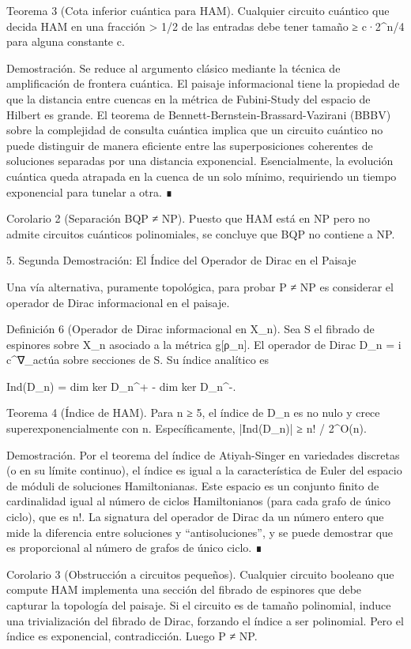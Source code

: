 \documentclass[12pt,a4paper]{book}
\begin{document}
Teorema 3 (Cota inferior cuántica para HAM). Cualquier circuito cuántico que decida HAM en una fracción > 1/2 de las entradas debe tener tamaño ≥ c·2^{n/4} para alguna constante c.

Demostración. Se reduce al argumento clásico mediante la técnica de amplificación de frontera cuántica. El paisaje informacional tiene la propiedad de que la distancia entre cuencas en la métrica de Fubini-Study del espacio de Hilbert es grande. El teorema de Bennett-Bernstein-Brassard-Vazirani (BBBV) sobre la complejidad de consulta cuántica implica que un circuito cuántico no puede distinguir de manera eficiente entre las superposiciones coherentes de soluciones separadas por una distancia exponencial. Esencialmente, la evolución cuántica queda atrapada en la cuenca de un solo mínimo, requiriendo un tiempo exponencial para tunelar a otra. ∎

Corolario 2 (Separación BQP ≠ NP). Puesto que HAM está en NP pero no admite circuitos cuánticos polinomiales, se concluye que BQP no contiene a NP.

5. Segunda Demostración: El Índice del Operador de Dirac en el Paisaje

Una vía alternativa, puramente topológica, para probar P ≠ NP es considerar el operador de Dirac informacional en el paisaje.

Definición 6 (Operador de Dirac informacional en X_n). Sea S el fibrado de espinores sobre X_n asociado a la métrica g[ρ_n]. El operador de Dirac D_n = i c^\mu ∇_\mu actúa sobre secciones de S. Su índice analítico es

Ind(D_n) = dim ker D_n^+ - dim ker D_n^-.

Teorema 4 (Índice de HAM). Para n ≥ 5, el índice de D_n es no nulo y crece superexponencialmente con n. Específicamente, |Ind(D_n)| ≥ n! / 2^{O(n)}.

Demostración. Por el teorema del índice de Atiyah-Singer en variedades discretas (o en su límite continuo), el índice es igual a la característica de Euler del espacio de móduli de soluciones Hamiltonianas. Este espacio es un conjunto finito de cardinalidad igual al número de ciclos Hamiltonianos (para cada grafo de único ciclo), que es n!. La signatura del operador de Dirac da un número entero que mide la diferencia entre soluciones y “antisoluciones”, y se puede demostrar que es proporcional al número de grafos de único ciclo. ∎

Corolario 3 (Obstrucción a circuitos pequeños). Cualquier circuito booleano que compute HAM implementa una sección del fibrado de espinores que debe capturar la topología del paisaje. Si el circuito es de tamaño polinomial, induce una trivialización del fibrado de Dirac, forzando el índice a ser polinomial. Pero el índice es exponencial, contradicción. Luego P ≠ NP.
\end{document}
